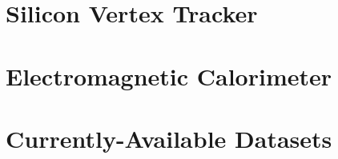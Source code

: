 \section{Silicon Vertex Tracker}

\section{Electromagnetic Calorimeter}

\section{Currently-Available Datasets}